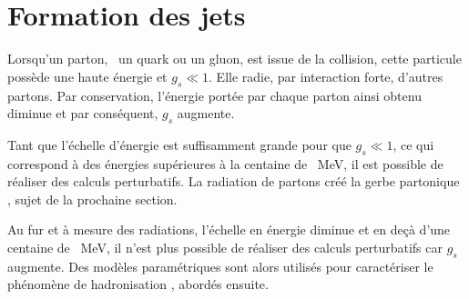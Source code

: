 \section{Formation des jets}\label{chapter-JERC-section-jets}
Lorsqu'un parton, \ie\ un quark ou un gluon, est issue de la collision, cette particule possède une haute énergie et $g_s \ll 1$.
Elle radie, par interaction forte, d'autres partons.
Par conservation, l'énergie portée par chaque parton ainsi obtenu diminue et par conséquent, $g_s$ augmente.
\par Tant que l'échelle d'énergie est suffisamment grande pour que $g_s \ll 1$, ce qui correspond à des énergies supérieures à la centaine de \SI{}{\MeV}, il est possible de réaliser des calculs perturbatifs.
La radiation de partons créé la \og gerbe partonique \fg, sujet de la prochaine section.
\par Au fur et à mesure des radiations, l'échelle en énergie diminue et en deçà d'une centaine de \SI{}{\MeV}, il n'est plus possible de réaliser des calculs perturbatifs car $g_s$ augmente.
Des modèles paramétriques sont alors utilisés pour caractériser le phénomène de \og hadronisation \fg, abordés ensuite.

